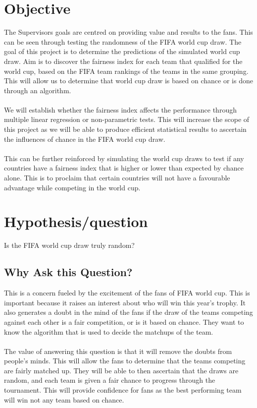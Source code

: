 \documentclass[11pt,a4paper]{scrartcl}
\begin{document}
\section{Objective}


The Supervisors goals are centred on providing value and results to the fans. This can be seen through testing the randomness of the FIFA world cup draw. The goal of this project is to determine the predictions of the simulated world cup draw. Aim is to discover the fairness index for each team that qualified for the world cup, based on the FIFA team rankings of the teams in the same grouping. This will allow us to determine that world cup draw is based on chance or is done through an algorithm.
\\ \\
We will establish whether the fairness index affects the performance through multiple linear regression or non-parametric tests. This will increase the scope of this project as we will be able to produce efficient statistical results to ascertain the influences of chance in the FIFA world cup draw.
\\ \\
This can be further reinforced by simulating the world cup draws to test if any countries have a fairness index that is higher or lower than expected by chance alone.  This is to proclaim that certain countries will not have a favourable advantage while competing in the world cup.


\section{Hypothesis/question}


Is the FIFA world cup draw truly random? 
               	
\subsection{Why Ask this Question? }

This is a concern fueled by the excitement of the fans of FIFA world cup. This is important because it raises an interest about who will win this year’s trophy. It also generates a doubt in the mind of the fans if the draw of the teams competing against each other is a fair competition, or is it based on chance. They want to know the algorithm that is used to decide the matchups of the team.
\\ \\
The value of answering this question is that it will remove the doubts from people’s minds. This will allow the fans to determine that the teams competing are fairly matched up. They will be able to then ascertain that the draws are random, and each team is given a fair chance to progress through the tournament. This will provide confidence for fans as the best performing team will win not any team based on chance.
\end{document}

